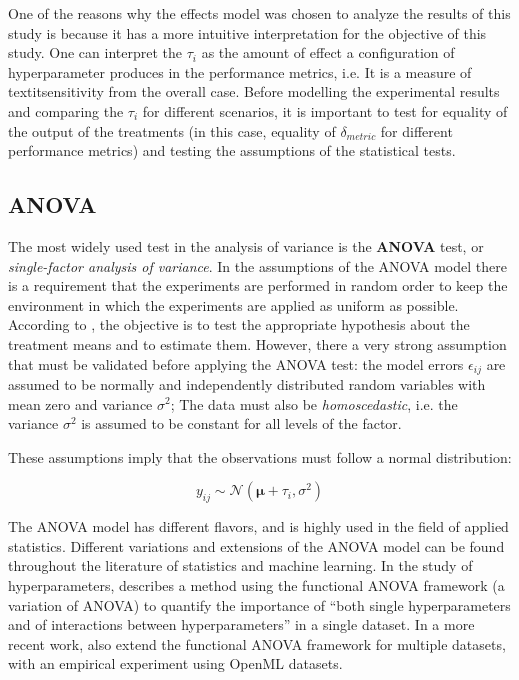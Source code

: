One of the reasons why the effects model was chosen to analyze the results of this study is because it has a more intuitive interpretation for the objective of this study. One can interpret the $\tau_i$ as the amount of effect a configuration of hyperparameter produces in the performance metrics, i.e. It is a measure of textit{sensitivity} from the overall case. Before modelling the experimental results and comparing the $\tau_i$ for different scenarios, it is important to test for equality of the output of the treatments (in this case, equality of $\delta_{metric}$ for different performance metrics) and testing the assumptions of the statistical tests.

\subsection{ANOVA}

The most widely used test in the analysis of variance is the \textbf{ANOVA} test, or \textit{single-factor analysis of variance}. In the assumptions of the ANOVA model there is a requirement that the experiments are performed in random order to keep the environment in which the experiments are applied as uniform as possible. According to \cite{montgomery2017design}, the objective is to test the appropriate hypothesis about the treatment means and to estimate them. However, there a very strong assumption that must be validated before applying the ANOVA test: the model errors $\epsilon_{ij}$ are assumed to be normally and independently distributed random variables with mean zero and variance $\sigma^2$; The data must also be \textit{homoscedastic}, i.e. the variance $\sigma^2$ is assumed to be constant for all levels of the factor.

These assumptions imply that the observations must follow a normal distribution:

$$y_{ij} \sim \mathcal{N}(\bm{\mu} + \tau_i, \sigma^2)$$

The ANOVA model has different flavors, and is highly used in the field of applied statistics. Different variations and extensions of the ANOVA model can be found throughout the literature of statistics and machine learning. In the study of hyperparameters, \cite{hoos201x4efficient} describes a method using the functional ANOVA framework (a variation of ANOVA) to quantify the importance of ``both single hyperparameters and of interactions between hyperparameters'' in a single dataset. In a more recent work, \cite{van2017empirical} also extend the functional ANOVA framework for multiple datasets, with an empirical experiment using OpenML datasets.

